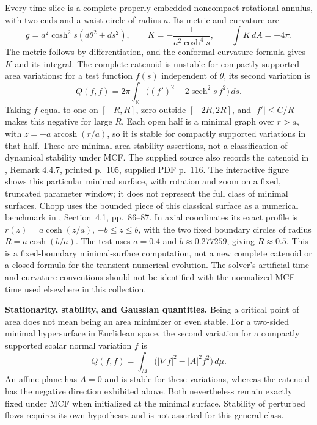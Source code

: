 \begin{example}
Every time slice is a complete properly embedded noncompact rotational annulus, with two ends and a waist circle of radius $a$. Its metric and curvature are
\[
 g=a^2\cosh^2s(d\theta^2+ds^2),\qquad
 K=-\frac1{a^2\cosh^4s},\qquad
 \int K\,dA=-4\pi.
\]
The metric follows by differentiation, and the conformal curvature formula gives $K$ and its integral. The complete catenoid is unstable for compactly supported area variations: for a test function $f(s)$ independent of $\theta$, its second variation is
\[
 Q(f,f)=2\pi\int_{\mathbb R}\bigl((f')^2-2\operatorname{sech}^2s\,f^2\bigr)\,ds.
\]
Taking $f$ equal to one on $[-R,R]$, zero outside $[-2R,2R]$, and $|f'|\leq C/R$ makes this negative for large $R$. Each open half is a minimal graph over $r>a$, with $z=\pm a\operatorname{arcosh}(r/a)$, so it is stable for compactly supported variations in that half. These are minimal-area stability assertions, not a classification of dynamical stability under MCF. The supplied source also records the catenoid in \cite{CatMan11}, Remark 4.4.7, printed p.~105, supplied PDF p.~116. The interactive figure shows this particular minimal surface, with rotation and zoom on a fixed, truncated parameter window; it does not represent the full class of minimal surfaces.
Chopp uses the bounded piece of this classical surface as a numerical
benchmark in \cite{CatChoppMinimal1993}, Section~4.1, pp.~86--87.
In axial coordinates its exact profile is
$r(z)=a\cosh(z/a)$, $-b\leq z\leq b$, with the two fixed boundary
circles of radius $R=a\cosh(b/a)$. The test uses $a=0.4$ and
$b\approx0.277259$, giving $R\approx0.5$. This is a fixed-boundary
minimal-surface computation, not a new complete catenoid or a closed
formula for the transient numerical evolution. The solver's artificial
time and curvature conventions should not be identified with the
normalized MCF time used elsewhere in this collection.

\textbf{Stationarity, stability, and Gaussian quantities.}
Being a critical point of area does not mean being an area minimizer or even stable. For a two-sided minimal hypersurface in Euclidean space, the second variation for a compactly supported scalar normal variation $f$ is
\[
 Q(f,f)=\int_M\bigl(|\nabla f|^2-|A|^2f^2\bigr)\,d\mu.
\]
An affine plane has $A=0$ and is stable for these variations, whereas the catenoid has the negative direction exhibited above. Both nevertheless remain exactly fixed under MCF when initialized at the minimal surface. Stability of perturbed flows requires its own hypotheses and is not asserted for this general class.


\end{example}
